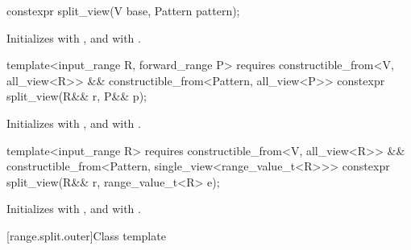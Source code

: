 \documentclass{wg21}
\begin{document}
%
\begin{itemdecl}
constexpr split_view(V base, Pattern pattern);
\end{itemdecl}

\begin{itemdescr}
\pnum
\effects Initializes  with , and
 with .
\end{itemdescr}

%
\begin{itemdecl}
template<input_range R, forward_range P>
requires constructible_from<V, all_view<R>> &&
constructible_from<Pattern, all_view<P>>
constexpr split_view(R&& r, P&& p);
\end{itemdecl}

\begin{itemdescr}
\pnum
\effects
Initializes  with , and
 with .
\end{itemdescr}

%
\begin{itemdecl}
template<input_range R>
requires constructible_from<V, all_view<R>> &&
constructible_from<Pattern, single_view<range_value_t<R>>>
constexpr split_view(R&& r, range_value_t<R> e);
\end{itemdecl}

\begin{itemdescr}
\pnum
\effects
Initializes  with , and
 with .
\end{itemdescr}

[range.split.outer]{Class template }
\end{document}
